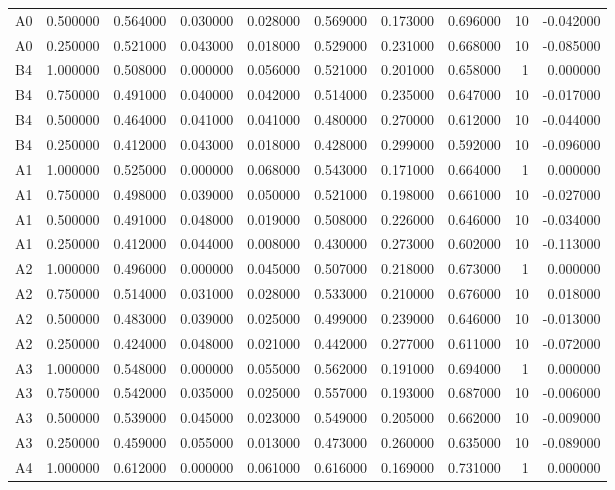 \begin{table}
\begin{tabular}{lrrrrrrrrr}
A0 & 0.500000 & 0.564000 & 0.030000 & 0.028000 & 0.569000 & 0.173000 & 0.696000 & 10 & -0.042000 \\
A0 & 0.250000 & 0.521000 & 0.043000 & 0.018000 & 0.529000 & 0.231000 & 0.668000 & 10 & -0.085000 \\
B4 & 1.000000 & 0.508000 & 0.000000 & 0.056000 & 0.521000 & 0.201000 & 0.658000 & 1 & 0.000000 \\
B4 & 0.750000 & 0.491000 & 0.040000 & 0.042000 & 0.514000 & 0.235000 & 0.647000 & 10 & -0.017000 \\
B4 & 0.500000 & 0.464000 & 0.041000 & 0.041000 & 0.480000 & 0.270000 & 0.612000 & 10 & -0.044000 \\
B4 & 0.250000 & 0.412000 & 0.043000 & 0.018000 & 0.428000 & 0.299000 & 0.592000 & 10 & -0.096000 \\
A1 & 1.000000 & 0.525000 & 0.000000 & 0.068000 & 0.543000 & 0.171000 & 0.664000 & 1 & 0.000000 \\
A1 & 0.750000 & 0.498000 & 0.039000 & 0.050000 & 0.521000 & 0.198000 & 0.661000 & 10 & -0.027000 \\
A1 & 0.500000 & 0.491000 & 0.048000 & 0.019000 & 0.508000 & 0.226000 & 0.646000 & 10 & -0.034000 \\
A1 & 0.250000 & 0.412000 & 0.044000 & 0.008000 & 0.430000 & 0.273000 & 0.602000 & 10 & -0.113000 \\
A2 & 1.000000 & 0.496000 & 0.000000 & 0.045000 & 0.507000 & 0.218000 & 0.673000 & 1 & 0.000000 \\
A2 & 0.750000 & 0.514000 & 0.031000 & 0.028000 & 0.533000 & 0.210000 & 0.676000 & 10 & 0.018000 \\
A2 & 0.500000 & 0.483000 & 0.039000 & 0.025000 & 0.499000 & 0.239000 & 0.646000 & 10 & -0.013000 \\
A2 & 0.250000 & 0.424000 & 0.048000 & 0.021000 & 0.442000 & 0.277000 & 0.611000 & 10 & -0.072000 \\
A3 & 1.000000 & 0.548000 & 0.000000 & 0.055000 & 0.562000 & 0.191000 & 0.694000 & 1 & 0.000000 \\
A3 & 0.750000 & 0.542000 & 0.035000 & 0.025000 & 0.557000 & 0.193000 & 0.687000 & 10 & -0.006000 \\
A3 & 0.500000 & 0.539000 & 0.045000 & 0.023000 & 0.549000 & 0.205000 & 0.662000 & 10 & -0.009000 \\
A3 & 0.250000 & 0.459000 & 0.055000 & 0.013000 & 0.473000 & 0.260000 & 0.635000 & 10 & -0.089000 \\
A4 & 1.000000 & 0.612000 & 0.000000 & 0.061000 & 0.616000 & 0.169000 & 0.731000 & 1 & 0.000000 \\

\end{tabular}
\end{table}
